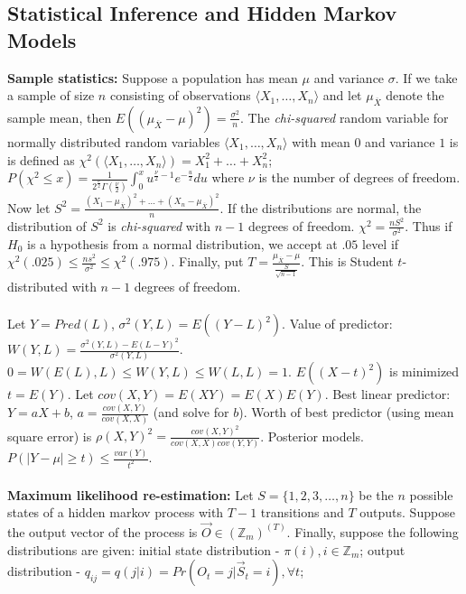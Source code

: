 \subsection {Statistical Inference and Hidden Markov Models}
{\bf Sample statistics:} Suppose a population has mean $\mu$ and variance $\sigma$. 
If we
take a sample of size $n$ consisting of observations $\langle X_1 , \ldots , X_n \rangle$ and
let $\mu_{\overline X}$ denote the sample mean, then 
$E((\mu_{\overline X} - \mu)^2) = {\frac {\sigma^2} n}$.  
The \emph{chi-squared}
random variable for normally distributed random variables $\langle X_1, \ldots , X_n \rangle$
with mean $0$ and variance $1$ is
is defined as $\chi^2(\langle X_1, \ldots , X_n \rangle )= X_1^2 + \ldots + X_n^2$;
$P(\chi^2 \leq x) = {\frac {1} {2^{\frac {\nu} {2}} \Gamma({\frac {\nu} {2}})}} \int_0^x u^{{\frac {\nu} {2}} -1} e^{-{\frac {u} {2}}} du$ where $\nu$ is the number of degrees of freedom.
Now let $S^2= {\frac {(X_1 - \mu_{\overline X})^2 + \ldots + (X_n - \mu_{\overline X})^2} {n}}$.
If the distributions are normal, the distribution of $S^2$ is \emph{chi-squared} with $n-1$
degrees of freedom. 
$\chi^2= {\frac {nS^2} {\sigma^2}}$.  Thus if $H_0$ is a hypothesis from a normal distribution,
we accept at $.05$ level if $\chi^2(.025) \leq {\frac {n s^2} {\sigma^2}} \leq \chi^2(.975)$.
Finally, put $T= {\frac {\mu_{\overline X} - \mu} {{\frac {S} {\sqrt {n-1}}}}}$.  This is
Student $t$-distributed with $n-1$ degrees of freedom.
\\
\\
Let $Y=Pred(L)$, $\sigma^2(Y,L)= E((Y-L)^2)$.  Value of predictor:
$W(Y,L)= {\frac {\sigma^2(Y,L) -E(L-Y)^2} {\sigma^2(Y,L)}}$. 
$0=W(E(L),L) \le W(Y,L) \le W(L,L)=1$.  $E((X-t)^2)$ is minimized $t=E(Y)$.
Let $cov(X,Y)= E(XY)=E(X)E(Y)$.
Best linear predictor: $Y=aX+b$, $a= {\frac {cov(X,Y)} {cov(X,X)}}$ (and solve for $b$).
Worth of best predictor (using mean square error) is
$\rho(X,Y)^2= {\frac {cov(X,Y)^2} {cov(X,X) cov(Y,Y)}}$.  Posterior models.
$P(|Y- \mu| \ge t) \le {\frac {var(Y)} {t^2}}$.
\\
\\
{\bf Maximum likelihood re-estimation:}
Let $S= \{ 1,2,3, \ldots, n\}$ be the $n$ possible
states of a hidden markov process with $T-1$ transitions and $T$ outputs.
Suppose the output vector of the process
is ${\vec O} \in ({\mathbb Z}_m)^{(T)}$.  Finally, suppose the following distributions
are given:
initial state distribution - $\pi(i), i \in {\mathbb Z}_m$;
output distribution - $q_{ij}= q(j|i)= Pr(O_t=j | {\vec S_t}= i), \forall t$;
